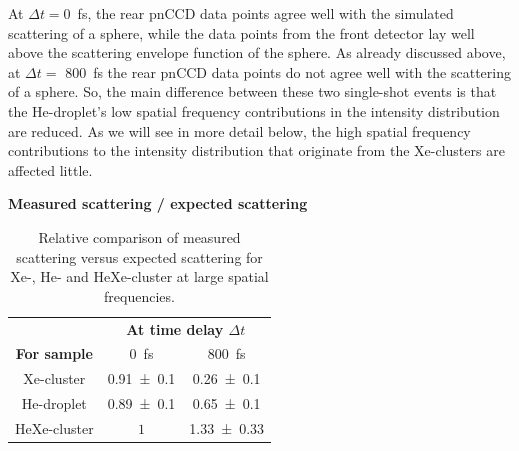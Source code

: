 At $\Delta t=$\SI{0}{\femto\second}, the rear pnCCD data points agree well with the simulated scattering of a sphere, while the data points from the front detector lay well above the scattering envelope function of the sphere. As already discussed above, at $\Delta t =$ \SI{800}{\femto\second} the rear pnCCD data points do not agree well with the scattering of a sphere. So, the main difference between these two single-shot events is that the He-droplet's low spatial frequency contributions in the intensity distribution are reduced. As we will see in more detail below, the high spatial frequency contributions to the intensity distribution that originate from the Xe-clusters are affected little.\\[1\baselineskip]
%
\begin{table}%
\centering
\textbf{Measured scattering / expected scattering}\\
\begin{tabular}{ | c || c | c | }
\hline
	 &\multicolumn{2}{c|}{\textbf{At time delay $\Delta t$}} \\
	\textbf{For sample} & \SI{0}{\femto\second}  & \SI{800}{\femto\second} \\ \hline \hline
	Xe-cluster & \num{0.91 \pm 0.1} & \num{0.26 \pm  0.1} \\ \hline
	He-droplet & \num{0.89 \pm 0.1} & \num{0.65\pm   0.1} \\ \hline
	HeXe-cluster & $1$ & \num{1.33 \pm  0.33} \\ \hline
\end{tabular}
\caption[Relative comparison of measured scattering versus expected scattering.]{Relative comparison of measured scattering versus expected scattering for Xe-, He- and HeXe-cluster at large spatial frequencies.}
\label{tab:he-vs-xe-vs-hexe-summary}
\end{table}
%
